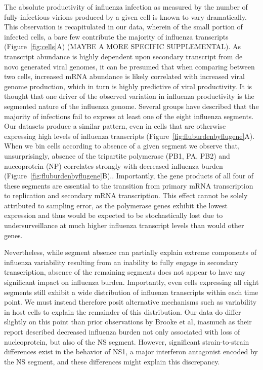 \documentclass[9pt,lineno]{elife}
\begin{document}
The absolute productivity of influenza infection as measured by the number of fully-infectious virions produced by a given cell is known to vary dramatically.  This observation is recapitulated in our data, wherein of the small portion of infected cells, a bare few contribute the majority of influenza transcripts (Figure~\ref{fig:cells}A) (MAYBE A MORE SPECIFIC SUPPLEMENTAL). As transcript abundance is highly dependent upon secondary transcript from de novo generated viral genomes, it can be presumed that when comparing between two cells, increased mRNA abundance is likely correlated with increased viral genome production, which in turn is highly predictive of viral productivity. It is thought that one driver of the observed variation in influenza productivity is the segmented nature of the influenza genome. Several groups have described that the majority of infections fail to express at least one of the eight influenza segments. Our datasets produce a similar pattern, even in cells that are otherwise expressing high levels of influenza transcripts (Figure~\ref{fig:fluburdenbyflugene}A). When we bin cells according to absence of a given segment we observe that, unsurprisingly, absence of the tripartite polymerase (PB1, PA, PB2) and nuceoprotein (NP) correlates strongly with decreased influenza burden (Figure~\ref{fig:fluburdenbyflugene}B).. Importantly, the gene products of all four of these segments are essential to the transition from primary mRNA transcription to replication and secondary mRNA transcription. This effect cannot be solely attributed to sampling error, as the polymerase genes exhibit the lowest expression and thus would be expected to be stochastically lost due to undersurveillance at much higher influenza transcript levels than would other genes. 

	Nevertheless, while segment absence can partially explain extreme components of influenza variability resulting from an inability to fully engage in secondary transcription, absence of the remaining segments does not appear to have any significant impact on influenza burden. Importantly, even cells expressing all eight segments still exhibit a wide distribution of influenza transcripts within each time point. We must instead therefore posit alternative mechanisms such as variability in host cells to explain the remainder of this distribution.  Our data do differ slightly on this point than prior observations by Brooke et al, inasmuch as their report described decreased influenza burden not only associated with loss of nucleoprotein, but also of the NS segment. However, significant strain-to-strain differences exist in the behavior of NS1, a major interferon antagonist encoded by the NS segment, and these differences might explain this discrepancy. 
\end{document}
